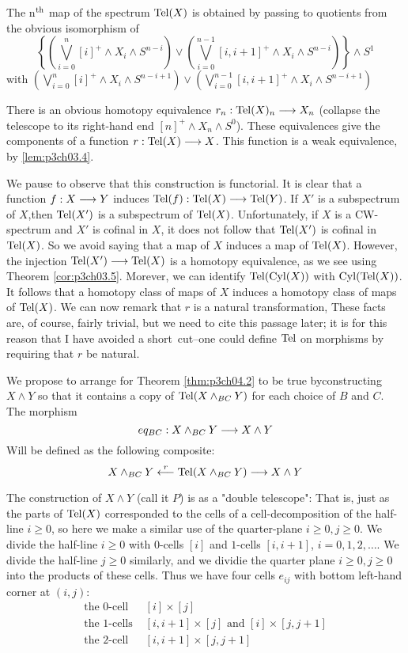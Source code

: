 \documentclass[../main]{subfiles}
\begin{document}
The n$^{\text{th}}$ map of the spectrum $\mathop{\mathrm{Tel}}(X)$ is obtained by passing to quotients from the obvious isomorphism of $$\left\{\left(\bigvee_{i=0}^n [i]^+\wedge X_i\wedge S^{n-i}\right)\vee \left(\bigvee_{i=0}^{n-1} [i,i+1]^+\wedge X_i\wedge S^{n-i} \right) \right\}\wedge S^1 $$
with 
$\left(\bigvee_{i=0}^n [i]^+\wedge X_i\wedge S^{n-i+1}\right)\vee \left(\bigvee_{i=0}^{n-1} [i,i+1]^+\wedge X_i\wedge S^{n-i+1} \right)$

There is an obvious homotopy equivalence $r_n:\mathop{\mathrm{Tel}}(X)_n\overset{}{\longrightarrow}X_n$ (collapse the telescope to its right-hand end $[n]^+\wedge X_n\wedge S^0$). These equivalences give the components of a function $r:\mathop{\mathrm{Tel}}(X)\overset{}{\longrightarrow}X$. This function is a weak equivalence, by \ref{lem:p3ch03.4}.

We pause to observe that this construction is functorial. It is clear
that a function $f:X\overset{}{\longrightarrow}Y$ induces $\mathop{\mathrm{Tel}}(f):\mathop{\mathrm{Tel}}(X)\overset{}{\longrightarrow}\mathop{\mathrm{Tel}}(Y)$. If $X'$ is a subspectrum of $X$,then $\mathop{\mathrm{Tel}}(X')$ is a subspectrum of $\mathop{\mathrm{Tel}}(X)$. Unfortunately, if $X$ is a CW-spectrum and $X'$ is cofinal in $X$, it does not follow that $\mathop{\mathrm{Tel}}(X')$ is cofinal in $\mathop{\mathrm{Tel}}(X)$. So we avoid saying that a map of $X$ induces a map of $\mathop{\mathrm{Tel}}(X)$. However, the injection $\mathop{\mathrm{Tel}}(X')\overset{}{\longrightarrow} \mathop{\mathrm{Tel}}(X) $ is a homotopy equivalence, as we see using Theorem \ref{cor:p3ch03.5}. Morever, we can identify $\mathop{\mathrm{Tel}}(\mathop{\mathrm{Cyl}}(X))$ with $\mathop{\mathrm{Cyl}}(\mathop{\mathrm{Tel}}(X))$. It follows that a homotopy class of maps of $X$ induces a homotopy class of
maps of $\mathop{\mathrm{Tel}}(X)$. We can now remark that $r$ is a natural transformation,
These facts are, of course, fairly trivial, but we need to cite this
passage later; it is for this reason that I have avoided a short~cut--one
could define $\mathop{\mathrm{Tel}}$ on morphisms by requiring that $r$ be natural. 

We propose to arrange for Theorem \ref{thm:p3ch04.2} to be true byconstructing $X\wedge Y$ so that it contains a copy of $\mathop{\mathrm{Tel}}(X\wedge_{BC}Y)$ for each choice of $B$ and $C$. The morphism $$eq_{BC}:X\wedge_{BC}Y\overset{}{\longrightarrow}X\wedge Y$$
Will be defined as the following composite:
$$X\wedge_{BC}Y\overset{r}{\longleftarrow}\mathop{\mathrm{Tel}}(X\wedge_{BC}Y)\overset{}{\longrightarrow}X\wedge Y$$

The construction of $X\wedge Y$ (call it $P$) is as a "double telescope": That is, just as the parts of $\mathop{\mathrm{Tel}}(X)$ corresponded to the cells of a cell-decomposition of the half-line $i\geq 0$, so here we make a similar use of the quarter-plane $i\geq 0,j\geq 0$. We divide the half-line $i\geq 0$ with $0$-cells $[i]$ and $1$-cells $[i,i+1]$, $i=0,1,2,\dots$. We divide the half-line $j\geq 0$ similarly, and we dividie the quarter plane $i\geq 0,j\geq 0$ into the products of these cells. Thus we have four cells $e_{ij}$ with bottom left-hand corner at $(i,j)$:
\begin{align*}
    \text{the 0-cell } & [i]\times [j]\\
    \text{the 1-cells }&[i,i+1]\times [j]\text{ and }[i]\times [j,j+1]\\
    \text{the 2-cell }&[i,i+1]\times [j,j+1] 
\end{align*}
\end{document}
